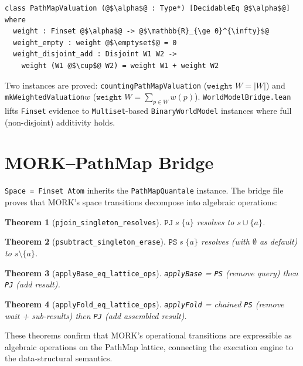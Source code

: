 \documentclass[11pt]{article}
\newtheorem{theorem}{Theorem}[section]
\theoremstyle{definition}
\theoremstyle{remark}
\newcommand{\MORK}{\textup{MORK}}
\newcommand{\PathMap}{\textup{PathMap}}
\begin{document}
\begin{lstlisting}[caption={PathMapValuation typeclass (excerpt).}]
class PathMapValuation (@$\alpha$@ : Type*) [DecidableEq @$\alpha$@] where
  weight : Finset @$\alpha$@ -> @$\mathbb{R}_{\ge 0}^{\infty}$@
  weight_empty : weight @$\emptyset$@ = 0
  weight_disjoint_add : Disjoint W1 W2 ->
    weight (W1 @$\cup$@ W2) = weight W1 + weight W2
\end{lstlisting}

\noindent
Two instances are proved: \texttt{countingPathMapValuation}
($\texttt{weight}\;W = \lvert W\rvert$) and \texttt{mkWeightedValuation}\;$w$
($\texttt{weight}\;W = \sum_{p\in W} w(p)$).
\texttt{WorldModelBridge.lean} lifts \texttt{Finset} evidence to
\texttt{Multiset}-based \texttt{BinaryWorldModel} instances where full
(non-disjoint) additivity holds.

\section{MORK--PathMap Bridge}
\label{sec:pathmapbridge}

\texttt{Space = Finset Atom} inherits the \texttt{PathMapQuantale} instance.
The bridge file proves that \MORK{}'s space transitions decompose into
algebraic operations:

\begin{theorem}[\texttt{pjoin\_singleton\_resolves}]
$\mathtt{PJ}\;s\;\{a\}$ resolves to $s \cup \{a\}$.
\end{theorem}

\begin{theorem}[\texttt{psubtract\_singleton\_erase}]
$\mathtt{PS}\;s\;\{a\}$ resolves (with $\emptyset$ as default) to
$s \setminus \{a\}$.
\end{theorem}

\begin{theorem}[\texttt{applyBase\_eq\_lattice\_ops}]
\texttt{applyBase} = \texttt{PS} (remove query) then \texttt{PJ} (add result).
\end{theorem}

\begin{theorem}[\texttt{applyFold\_eq\_lattice\_ops}]
\texttt{applyFold} = chained \texttt{PS} (remove wait + sub-results) then
\texttt{PJ} (add assembled result).
\end{theorem}

These theorems confirm that \MORK{}'s operational transitions are expressible
as algebraic operations on the \PathMap{} lattice, connecting the execution
engine to the data-structural semantics.
\end{document}
